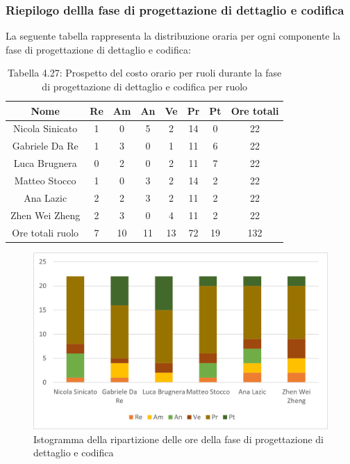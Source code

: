 \subsubsection{Riepilogo dellla fase di progettazione di dettaglio e codifica}
%
La seguente tabella rappresenta la distribuzione oraria per ogni componente la fase di progettazione di dettaglio e codifica:
\begin{table}[h]
	\setlength\extrarowheight{5pt}
	\centering
	\begin{tabularx}{\textwidth}{|ccccccc|c|}
		\hline
		\rowcolor{white}
		\textbf{Nome} & \textbf{Re} & \textbf{Am} & \textbf{An} & \textbf{Ve} & \textbf{Pr}& \textbf{Pt} & \textbf{Ore totali} \\
		\hline
		Nicola Sinicato &1&0&5&2&14&0&22 \\
		Gabriele Da Re &1&3&0&1&11&6&22 \\
		Luca Brugnera &0&2&0&2&11&7&22 \\
		Matteo Stocco &1&0&3&2&14&2&22 \\
		Ana Lazic &2&2&3&2&11&2&22 \\
		Zhen Wei Zheng &2&3&0&4&11&2&22 \\
		\hline
		Ore totali ruolo &7&10&11&13&72&19&132 \\
		\hline
	\end{tabularx}
	\vspace{10pt}
	\caption{Tabella 4.27: Prospetto del costo orario per ruoli durante la fase di progettazione di dettaglio e codifica per ruolo}
\end{table}
\begin{figure}[H]
    \centering
    \includegraphics[scale=0.6]{img/grafi preventivo/istogrammi/codifica/complessivo.png}
    \caption{Istogramma della ripartizione delle ore della fase di progettazione di dettaglio e codifica}
\end{figure}
